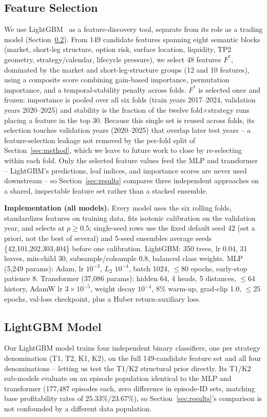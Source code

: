 \documentclass[sigconf,review,anonymous]{acmart}
\begin{document}
\subsection{Feature Selection}
We use LightGBM~\cite{ke2017lightgbm} as a feature-discovery tool, separate from its role as a trading model (Section~\ref{sec:lgbm-scope}). From 149 candidate features spanning eight semantic blocks (market, short-leg structure, option risk, surface location, liquidity, TP2 geometry, strategy/calendar, lifecycle pressure), we select 48 features $F^{\ast}$, dominated by the market and short-leg-structure groups (12 and 10 features), using a composite score combining gain-based importance, permutation importance, and a temporal-stability penalty across folds. $F^{\ast}$ is selected once and frozen: importance is pooled over all six folds (train years 2017--2024, validation years 2020--2025) and stability is the fraction of the twelve fold$\times$strategy runs placing a feature in the top 30. Because this single set is reused across folds, its selection touches validation years (2020--2025) that overlap later test years -- a feature-selection leakage not removed by the per-fold split of Section~\ref{sec:method}, which we leave to future work to close by re-selecting within each fold. Only the selected feature values feed the MLP and transformer -- LightGBM's predictions, leaf indices, and importance scores are never used downstream -- so Section~\ref{sec:results} compares three independent approaches on a shared, inspectable feature set rather than a stacked ensemble.

\noindent\textbf{Implementation (all models).} Every model uses the six rolling folds, standardizes features on training data, fits isotonic calibration on the validation year, and selects at $p\ge0.5$; single-seed rows use the fixed default seed 42 (set a priori, not the best of several) and 5-seed ensembles average seeds \{42,101,202,303,404\} before one calibration. LightGBM: 350 trees, lr 0.04, 31 leaves, min-child 30, subsample/colsample 0.8, balanced class weights. MLP (5{,}249 params): Adam, lr $10^{-3}$, $L_2$ $10^{-4}$, batch 1024, $\le$80 epochs, early-stop patience 8. Transformer (37{,}086 params): hidden 64, 4 heads, 5 distances, $\le$64 history, AdamW lr $3{\times}10^{-5}$, weight decay $10^{-4}$, 8\% warm-up, grad-clip 1.0, $\le$25 epochs, val-loss checkpoint, plus a Huber return-auxiliary loss.

\subsection{LightGBM Model}
\label{sec:lgbm-scope}
Our LightGBM model trains four independent binary classifiers, one per strategy denomination (T1, T2, K1, K2), on the full 149-candidate feature set and all four denominations -- letting us test the T1/K2 structural prior directly. Its T1/K2 sub-models evaluate on an episode population identical to the MLP and transformer (177{,}487 episodes each, zero difference in episode-ID sets, matching base profitability rates of 25.33\%/23.67\%), so Section~\ref{sec:results}'s comparison is not confounded by a different data population.
\end{document}
